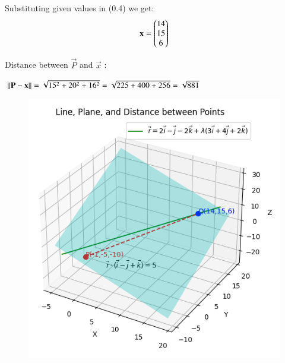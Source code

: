 \documentclass[journal]{IEEEtran}
\begin{document}
Substituting given values in (0.4) we get:
\begin{align}
    \mathbf{x}=\begin{pmatrix}14 \\ 15 \\ 6\end{pmatrix}
\end{align}

Distance between $\vec{P}$ and $\vec{x}$ :



    
$\left\lVert\mathbf{P}-\mathbf{x}\right\rVert=\sqrt{15^2 + 20^2 + 16^2}
= \sqrt{225 + 400 + 256}
= \sqrt{881}$


\begin{figure}[ht!]
\centering
\includegraphics[height=0.6\textheight, keepaspectratio]{figs/q8.png}
\end{figure}
\end{document}
